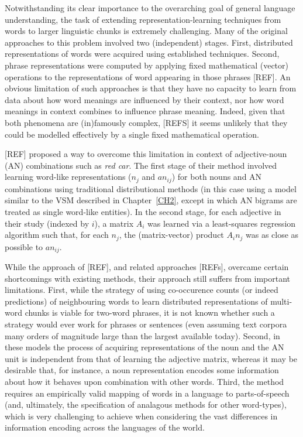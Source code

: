 \label{CH4}

Notwithstanding its clear importance to the overarching goal of general language understanding, the task of extending representation-learning techniques from words to larger linguistic chunks is extremely challenging. Many of the original approaches to this problem involved two (independent) stages. First, distributed representations of words were acquired using established techniques. Second, phrase representations were computed by applying fixed mathematical (vector) operations to the representations of word appearing in those phrases [REF]. An obvious limitation of such approaches is that they have no capacity to learn from data about how word meanings are influenced by their context, nor how word meanings in context combines to influence phrase meaning. Indeed, given that both phenomena are (in)famously complex, [REFS] it seems unlikely that they could be modelled effectively by a single fixed mathematical operation.  

[REF] proposed a way to overcome this limitation in context of adjective-noun (AN) combinations such as \emph{red car}. The first stage of their method involved learning word-like representations (\(n_j\) and \(an_{ij}\)) for both nouns and AN combinations using traditional distributional methods (in this case using a model similar to the VSM described in Chapter~\ref{CH2}, except in which AN bigrams are treated as single word-like entities). In the second stage, for each adjective in their study (indexed by \(i\)), a matrix \(A_i\) was learned via a least-squares regression algorithm such that, for each \(n_j\), the (matrix-vector) product \(A_i n_j\) was as close as possible to \(an_{ij}\).

While the approach of [REF], and related approaches [REFs], overcame certain shortcomings with existing methods, their approach still suffers from important limitations. First, while the strategy of using co-occurence counts (or indeed predictions) of neighbouring words to learn distributed representations of multi-word chunks is viable for two-word phrases, it is not known whether such a strategy would ever work for phrases or sentences (even assuming text corpora many orders of magnitude large than the largest available today). Second, in these models the process of acquiring representations of the noun and the AN unit is independent from that of learning the adjective matrix, whereas it may be desirable that, for instance, a noun representation encodes some information about how it behaves upon combination with other words. Third, the method requires an empirically valid mapping of words in a language to parts-of-speech (and, ultimately, the specification of analagous methods for other word-types), which is very challenging to achieve when considering the vast differences in information encoding across the languages of the world. 

